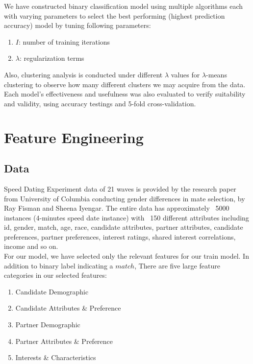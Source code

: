 \documentclass[11pt,letterpaper]{article}
\begin{document}
We have constructed binary classification model using multiple algorithms each with varying parameters to select the best performing (highest prediction accuracy) model by tuning following parameters:
\begin{enumerate}
\item $I$: number of training iterations
\item $\lambda$: regularization terms
\end{enumerate}

Also, clustering analysis is conducted under different $\lambda$ values for $\lambda$-means clustering to observe how many different clusters we may acquire from the data.\\

Each model's effectiveness and usefulness was also evaluated to verify suitability and validity, using accuracy testings and 5-fold cross-validation.

\section{Feature Engineering}

\subsection{Data}
Speed Dating Experiment data of 21 waves is provided by the research paper from University of Columbia conducting gender differences in mate selection, by Ray Fisman and Sheena Iyengar. The entire data has approximately ~5000 instances (4-minutes speed date instance) with ~150 different attributes including id, gender, match, age, race, candidate attributes, partner attributes, candidate preferences, partner preferences, interest ratings, shared interest correlations, income and so on.\\

For our model, we have selected only the relevant features for our train model. In addition to binary label indicating a $match$, There are five large feature categories in our selected features:

\begin{enumerate}
\item Candidate Demographic
\item Candidate Attributes \& Preference
\item Partner Demographic
\item Partner Attributes \& Preference
\item Interests \& Characteristics
\end{enumerate}
\end{document}
